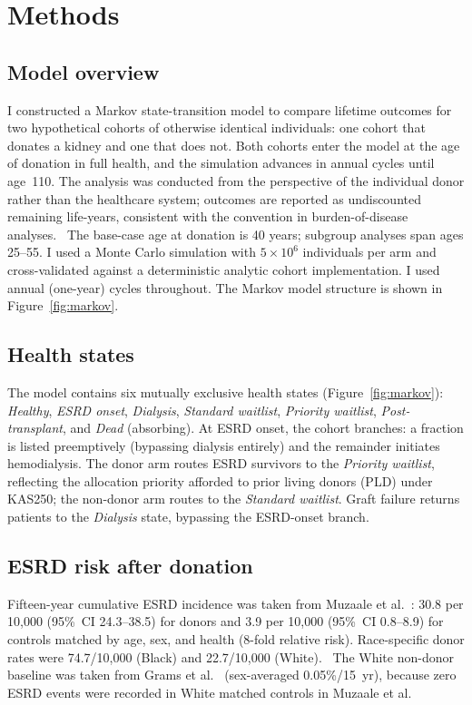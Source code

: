\section{Methods}
\label{sec:methods}

\subsection{Model overview}
I constructed a Markov state-transition model to compare lifetime outcomes for two hypothetical cohorts of otherwise identical individuals: one cohort that donates a kidney and one that does not. Both cohorts enter the model at the age of donation in full health, and the simulation advances in annual cycles until age~110. The analysis was conducted from the perspective of the individual donor rather than the healthcare system; outcomes are reported as undiscounted remaining life-years, consistent with the convention in burden-of-disease analyses.~\cite{murray_gbd_2012} The base-case age at donation is 40 years; subgroup analyses span ages 25--55. I used a Monte Carlo simulation with $5 \times 10^6$ individuals per arm and cross-validated against a deterministic analytic cohort implementation. I used annual (one-year) cycles throughout.
The Markov model structure is shown in Figure~\ref{fig:markov}.

\subsection{Health states}
The model contains six mutually exclusive health states (Figure~\ref{fig:markov}): \textit{Healthy}, \textit{ESRD onset}, \textit{Dialysis}, \textit{Standard waitlist}, \textit{Priority waitlist}, \textit{Post-transplant}, and \textit{Dead} (absorbing). At ESRD onset, the cohort branches: a fraction is listed preemptively (bypassing dialysis entirely) and the remainder initiates hemodialysis. The donor arm routes ESRD survivors to the \textit{Priority waitlist}, reflecting the allocation priority afforded to prior living donors (PLD) under KAS250; the non-donor arm routes to the \textit{Standard waitlist}. Graft failure returns patients to the \textit{Dialysis} state, bypassing the ESRD-onset branch.

\subsection{ESRD risk after donation}
Fifteen-year cumulative ESRD incidence was taken from Muzaale et al.~\cite{muzaale_risk_2014}: 30.8 per 10,000 (95\%~CI 24.3--38.5) for donors and 3.9 per 10,000 (95\%~CI 0.8--8.9) for controls matched by age, sex, and health (8-fold relative risk). Race-specific donor rates were 74.7/10,000 (Black) and 22.7/10,000 (White).~\cite{muzaale_risk_2014} The White non-donor baseline was taken from Grams et al.~\cite{grams_kidney-failure_2016} (sex-averaged 0.05\%/15~yr), because zero ESRD events were recorded in White matched controls in Muzaale et al.

